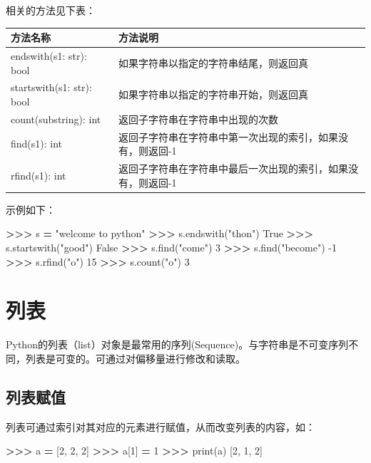 \documentclass[]{ctexbook}
\newenvironment{Shaded}{\begin{snugshade}}{\end{snugshade}}
\newcommand{\BuiltInTok}[1]{#1}
\newcommand{\DecValTok}[1]{\textcolor[rgb]{0.00,0.00,0.81}{#1}}
\newcommand{\NormalTok}[1]{#1}
\newcommand{\OperatorTok}[1]{\textcolor[rgb]{0.81,0.36,0.00}{\textbf{#1}}}
\newcommand{\StringTok}[1]{\textcolor[rgb]{0.31,0.60,0.02}{#1}}
\newcommand{\VariableTok}[1]{\textcolor[rgb]{0.00,0.00,0.00}{#1}}
\begin{document}
相关的方法见下表：

\begin{longtable}[]{@{}ll@{}}
\toprule
方法名称 & 方法说明\tabularnewline
\midrule
\endhead
endswith(s1: str): bool & 如果字符串以指定的字符串结尾，则返回真\tabularnewline
startswith(s1: str): bool & 如果字符串以指定的字符串开始，则返回真\tabularnewline
count(substring): int & 返回子字符串在字符串中出现的次数\tabularnewline
find(s1): int & 返回子字符串在字符串中第一次出现的索引，如果没有，则返回-1\tabularnewline
rfind(s1): int & 返回子字符串在字符串中最后一次出现的索引，如果没有，则返回-1\tabularnewline
\bottomrule
\end{longtable}

示例如下：

\begin{Shaded}
\begin{Highlighting}[]
\OperatorTok{>>>}\NormalTok{ s }\OperatorTok{=} \StringTok{"welcome to python"}
\OperatorTok{>>>}\NormalTok{ s.endswith(}\StringTok{"thon"}\NormalTok{)}
\VariableTok{True}
\OperatorTok{>>>}\NormalTok{ s.startswith(}\StringTok{"good"}\NormalTok{)}
\VariableTok{False}
\OperatorTok{>>>}\NormalTok{ s.find(}\StringTok{"come"}\NormalTok{)}
\DecValTok{3}
\OperatorTok{>>>}\NormalTok{ s.find(}\StringTok{"become"}\NormalTok{)}
\DecValTok{-1}
\OperatorTok{>>>}\NormalTok{ s.rfind(}\StringTok{"o"}\NormalTok{)}
\DecValTok{15}
\OperatorTok{>>>}\NormalTok{ s.count(}\StringTok{"o"}\NormalTok{)}
\DecValTok{3}
\end{Highlighting}
\end{Shaded}

\hypertarget{ux5217ux8868}{%
\section{列表}\label{ux5217ux8868}}

Python的列表（list）对象是最常用的序列(Sequence)。与字符串是不可变序列不同，列表是可变的。可通过对偏移量进行修改和读取。

\hypertarget{ux5217ux8868ux8d4bux503c}{%
\subsection{列表赋值}\label{ux5217ux8868ux8d4bux503c}}

列表可通过索引对其对应的元素进行赋值，从而改变列表的内容，如：

\begin{Shaded}
\begin{Highlighting}[]
\OperatorTok{>>>}\NormalTok{ a }\OperatorTok{=}\NormalTok{ [}\DecValTok{2}\NormalTok{, }\DecValTok{2}\NormalTok{, }\DecValTok{2}\NormalTok{]}
\OperatorTok{>>>}\NormalTok{ a[}\DecValTok{1}\NormalTok{] }\OperatorTok{=} \DecValTok{1}
\OperatorTok{>>>} \BuiltInTok{print}\NormalTok{(a)}
\NormalTok{[}\DecValTok{2}\NormalTok{, }\DecValTok{1}\NormalTok{, }\DecValTok{2}\NormalTok{]}
\end{Highlighting}
\end{Shaded}
\end{document}
